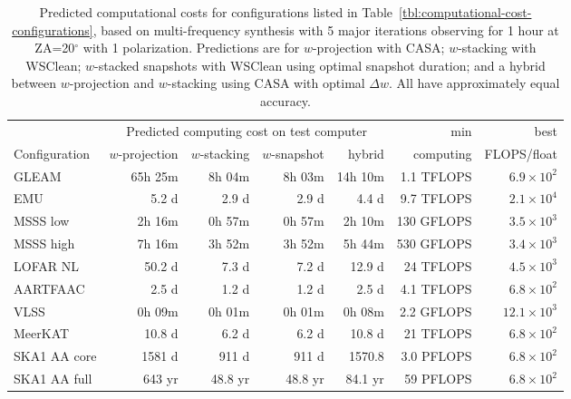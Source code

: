 \documentclass[useAMS,usenatbib]{mn2e}
\newcommand{\degree}{\ensuremath{^{\circ}}\xspace}
\begin{document}
\begin{table}
\caption{Predicted computational costs for configurations listed in Table~\ref{tbl:computational-cost-configurations}, based on multi-frequency synthesis with 5 major iterations observing for 1 hour at ZA=20\degree with 1 polarization. Predictions are for $w$-projection with CASA; $w$-stacking with WSClean; $w$-stacked snapshots with WSClean using optimal snapshot duration; and a hybrid between $w$-projection and $w$-stacking using CASA with optimal $\Delta w$. All have approximately equal accuracy.} \label{tbl:computational-cost-predictions}
\begin{tabular}{l|rrrr|rr}
               & \multicolumn{4}{c|}{Predicted computing cost on test computer} & min & best \\
 Configuration & $w$-projection & $w$-stacking & $w$-snapshot & hybrid & computing & FLOPS/float \\
 \hline
 GLEAM    &  65h 25m & 8h 04m &  8h 03m & 14h 10m   & 1.1 TFLOPS & $6.9 \times 10^2$    \\
 EMU      &    5.2 d &  2.9 d &   2.9 d & 4.4 d     & 9.7 TFLOPS & $2.1 \times 10^4$      \\
 MSSS low &  2h 16m  & 0h 57m &  0h 57m & 2h 10m    & 130 GFLOPS & $3.5 \times 10^3$   \\
 MSSS high&  7h 16m  & 3h 52m &  3h 52m & 5h 44m    & 530 GFLOPS & $3.4 \times 10^3$   \\
 LOFAR NL &  50.2 d  &  7.3 d &   7.2 d & 12.9 d    &  24 TFLOPS & $4.5 \times 10^3$ \\
 AARTFAAC &  2.5 d   &  1.2 d &   1.2 d &   2.5 d   & 4.1 TFLOPS & $6.8 \times 10^2$   \\
 VLSS     &  0h 09m  & 0h 01m &  0h 01m &  0h 08m   & 2.2 GFLOPS & $12.1 \times 10^3$     \\
 MeerKAT  &   10.8 d &  6.2 d &   6.2 d &  10.8 d   &  21 TFLOPS & $6.8 \times 10^2$ \\
 SKA1 AA core&1581 d &  911 d &   911 d &  1570.8   & 3.0 PFLOPS & $6.8 \times 10^2$ \\
 SKA1 AA full& 643 yr& 48.8 yr & 48.8 yr& 84.1 yr   &  59 PFLOPS & $6.8 \times 10^2$ \\
\end{tabular}
\end{table}
\end{document}
